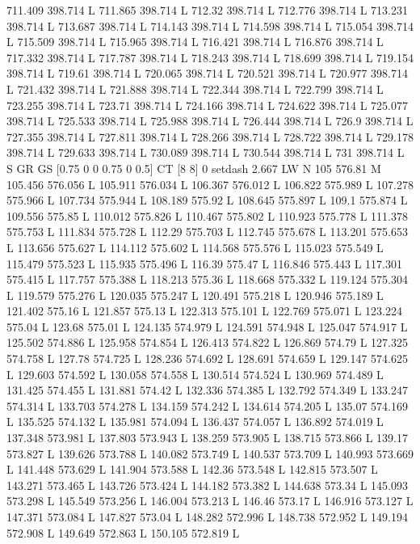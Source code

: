 711.409 398.714 L
711.865 398.714 L
712.32 398.714 L
712.776 398.714 L
713.231 398.714 L
713.687 398.714 L
714.143 398.714 L
714.598 398.714 L
715.054 398.714 L
715.509 398.714 L
715.965 398.714 L
716.421 398.714 L
716.876 398.714 L
717.332 398.714 L
717.787 398.714 L
718.243 398.714 L
718.699 398.714 L
719.154 398.714 L
719.61 398.714 L
720.065 398.714 L
720.521 398.714 L
720.977 398.714 L
721.432 398.714 L
721.888 398.714 L
722.344 398.714 L
722.799 398.714 L
723.255 398.714 L
723.71 398.714 L
724.166 398.714 L
724.622 398.714 L
725.077 398.714 L
725.533 398.714 L
725.988 398.714 L
726.444 398.714 L
726.9 398.714 L
727.355 398.714 L
727.811 398.714 L
728.266 398.714 L
728.722 398.714 L
729.178 398.714 L
729.633 398.714 L
730.089 398.714 L
730.544 398.714 L
731 398.714 L
S
GR
GS
[0.75 0 0 0.75 0 0.5] CT
[8 8] 0 setdash
2.667 LW
N
105 576.81 M
105.456 576.056 L
105.911 576.034 L
106.367 576.012 L
106.822 575.989 L
107.278 575.966 L
107.734 575.944 L
108.189 575.92 L
108.645 575.897 L
109.1 575.874 L
109.556 575.85 L
110.012 575.826 L
110.467 575.802 L
110.923 575.778 L
111.378 575.753 L
111.834 575.728 L
112.29 575.703 L
112.745 575.678 L
113.201 575.653 L
113.656 575.627 L
114.112 575.602 L
114.568 575.576 L
115.023 575.549 L
115.479 575.523 L
115.935 575.496 L
116.39 575.47 L
116.846 575.443 L
117.301 575.415 L
117.757 575.388 L
118.213 575.36 L
118.668 575.332 L
119.124 575.304 L
119.579 575.276 L
120.035 575.247 L
120.491 575.218 L
120.946 575.189 L
121.402 575.16 L
121.857 575.13 L
122.313 575.101 L
122.769 575.071 L
123.224 575.04 L
123.68 575.01 L
124.135 574.979 L
124.591 574.948 L
125.047 574.917 L
125.502 574.886 L
125.958 574.854 L
126.413 574.822 L
126.869 574.79 L
127.325 574.758 L
127.78 574.725 L
128.236 574.692 L
128.691 574.659 L
129.147 574.625 L
129.603 574.592 L
130.058 574.558 L
130.514 574.524 L
130.969 574.489 L
131.425 574.455 L
131.881 574.42 L
132.336 574.385 L
132.792 574.349 L
133.247 574.314 L
133.703 574.278 L
134.159 574.242 L
134.614 574.205 L
135.07 574.169 L
135.525 574.132 L
135.981 574.094 L
136.437 574.057 L
136.892 574.019 L
137.348 573.981 L
137.803 573.943 L
138.259 573.905 L
138.715 573.866 L
139.17 573.827 L
139.626 573.788 L
140.082 573.749 L
140.537 573.709 L
140.993 573.669 L
141.448 573.629 L
141.904 573.588 L
142.36 573.548 L
142.815 573.507 L
143.271 573.465 L
143.726 573.424 L
144.182 573.382 L
144.638 573.34 L
145.093 573.298 L
145.549 573.256 L
146.004 573.213 L
146.46 573.17 L
146.916 573.127 L
147.371 573.084 L
147.827 573.04 L
148.282 572.996 L
148.738 572.952 L
149.194 572.908 L
149.649 572.863 L
150.105 572.819 L
